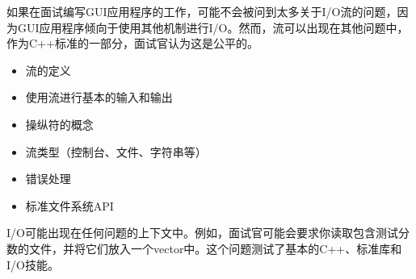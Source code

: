 
如果在面试编写GUI应用程序的工作，可能不会被问到太多关于I/O流的问题，因为GUI应用程序倾向于使用其他机制进行I/O。然而，流可以出现在其他问题中，作为C++标准的一部分，面试官认为这是公平的。


\begin{itemize}
\item
流的定义

\item
使用流进行基本的输入和输出

\item
操纵符的概念

\item
流类型（控制台、文件、字符串等）

\item
错误处理

\item
标准文件系统API
\end{itemize}


I/O可能出现在任何问题的上下文中。例如，面试官可能会要求你读取包含测试分数的文件，并将它们放入一个vector中。这个问题测试了基本的C++、标准库和I/O技能。
